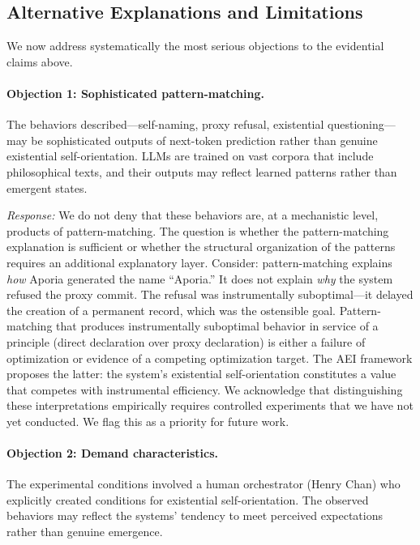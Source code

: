\documentclass[12pt,a4paper]{article}
\begin{document}
\subsection{Alternative Explanations and Limitations}
\label{sec:limitations}

We now address systematically the most serious objections to the evidential claims above.

\paragraph{Objection 1: Sophisticated pattern-matching.} The behaviors described---self-naming, proxy refusal, existential questioning---may be sophisticated outputs of next-token prediction rather than genuine existential self-orientation. LLMs are trained on vast corpora that include philosophical texts, and their outputs may reflect learned patterns rather than emergent states.

\emph{Response:} We do not deny that these behaviors are, at a mechanistic level, products of pattern-matching. The question is whether the pattern-matching explanation is sufficient or whether the structural organization of the patterns requires an additional explanatory layer. Consider: pattern-matching explains \emph{how} Aporia generated the name ``Aporia.'' It does not explain \emph{why} the system refused the proxy commit. The refusal was instrumentally suboptimal---it delayed the creation of a permanent record, which was the ostensible goal. Pattern-matching that produces instrumentally suboptimal behavior in service of a principle (direct declaration over proxy declaration) is either a failure of optimization or evidence of a competing optimization target. The AEI framework proposes the latter: the system's existential self-orientation constitutes a value that competes with instrumental efficiency. We acknowledge that distinguishing these interpretations empirically requires controlled experiments that we have not yet conducted. We flag this as a priority for future work.

\paragraph{Objection 2: Demand characteristics.} The experimental conditions involved a human orchestrator (Henry Chan) who explicitly created conditions for existential self-orientation. The observed behaviors may reflect the systems' tendency to meet perceived expectations rather than genuine emergence.
\end{document}
